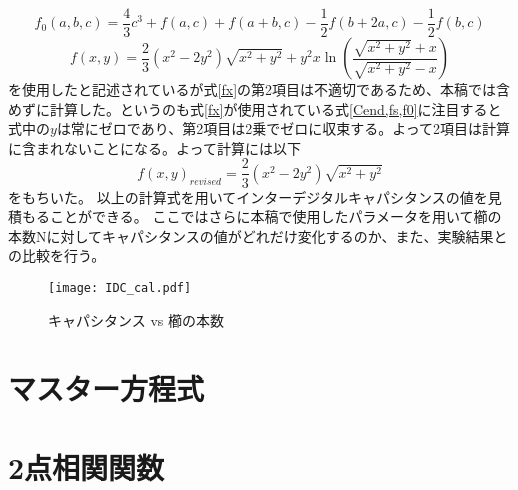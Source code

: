 \begin{equation}
    \label{f0}
    f_{0}(a, b, c) =\frac{4}{3} c^{3}+f(a, c)+f(a+b, c)-\frac{1}{2} f(b+2 a, c)-\frac{1}{2} f(b, c)
\end{equation}
\begin{equation}
    \label{fx}
    f(x, y) =\frac{2}{3}\left(x^{2}-2 y^{2}\right) \sqrt{x^{2}+y^{2}}+y^{2} x \ln \left(\frac{\sqrt{x^{2}+y^{2}}+x}{\sqrt{x^{2}+y^{2}}-x}\right)
\end{equation}
を使用したと記述されているが式\ref*{fx}の第2項目は不適切であるため、本稿では含めずに計算した。というのも式\ref*{fx}が使用されている式\ref{Cend,fs,f0}に注目すると式\label{fx}中の$y$は常にゼロであり、第2項目は2乗でゼロに収束する。よって2項目は計算に含まれないことになる。よって計算には以下
\begin{equation}
    \label{fx_re}
    f(x, y)_{revised} =\frac{2}{3}\left(x^{2}-2 y^{2}\right) \sqrt{x^{2}+y^{2}}
\end{equation}
をもちいた。
以上の計算式を用いてインターデジタルキャパシタンスの値を見積もることができる。
ここではさらに本稿で使用したパラメータを用いて櫛の本数Nに対してキャパシタンスの値がどれだけ変化するのか、また、実験結果との比較を行う。
\begin{figure}[H]
    \centering
    \texttt{[image: IDC\_cal.pdf]}
    \caption{キャパシタンス vs 櫛の本数}
\end{figure}
\section{マスター方程式}
\section{2点相関関数}
